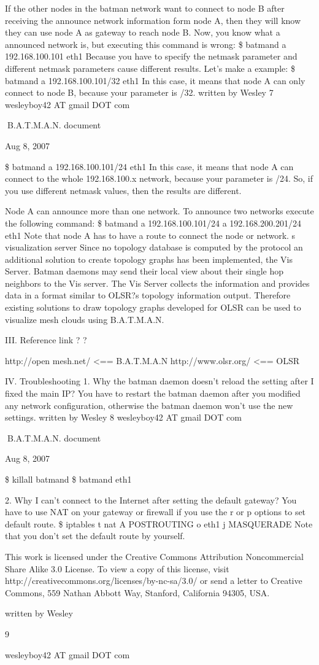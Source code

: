 \documentclass[
	12pt,
	a4paper,
	twoside,
	english,
	headsepline,
	footnosepline,
	automark,
	normalheadings,
	openany,
	cleardoubleplain,
	abstracton,
	idxtotoc,
	liststotoc,
	bibtotoc,
 	BCOR8mm,
]{scrartcl}
\begin{document}
If the other nodes in the batman network want to connect to node B after receiving the  announce network information form node A, then they will know they can use node A as  gateway to reach node B. Now, you know what a announced network is, but executing this command is wrong: \$ batmand   a 192.168.100.101  eth1  Because you have to specify the netmask parameter and different netmask parameters cause  different results. Let's make a example: \$ batmand   a 192.168.100.101/32  eth1 In this case, it means that node A can only connect to node B, because your parameter is /32. written by Wesley 7 wesleyboy42 AT gmail DOT com

B.A.T.M.A.N. document

Aug 8, 2007

\$ batmand   a 192.168.100.101/24  eth1 In this case, it means that node A can connect to the whole 192.168.100.x network, because  your parameter is /24. So, if you use different netmask values, then the results are different.

Node A can  announce more than one network. To announce two networks execute the following  command: \$ batmand   a 192.168.100.101/24   a 192.168.200.201/24 eth1  Note that node A has to have a route to connect the node or network.  s visualization server Since no topology database is computed by the protocol an additional solution to create  topology graphs has been implemented, the Vis Server. Batman daemons may send their  local view about their single hop neighbors to the Vis server. The Vis Server collects the  information and provides data in a format similar to OLSR?s topology information output.  Therefore existing solutions to draw topology graphs developed for OLSR can be used to  visualize mesh clouds using B.A.T.M.A.N.

III.  Reference link
? ?

http://open mesh.net/ <== B.A.T.M.A.N http://www.olsr.org/ <== OLSR 

IV.  Troubleshooting
1.  Why the batman daemon doesn't reload the setting after I fixed the main IP?
You have to restart the batman daemon after you modified any network configuration,  otherwise the batman daemon won't use the new settings.  written by Wesley 8 wesleyboy42 AT gmail DOT com

B.A.T.M.A.N. document

Aug 8, 2007

\$ killall batmand   \$ batmand eth1

2.  Why I can't connect to the Internet after setting the default gateway? 
You have to use NAT on your gateway or firewall if you use the  r or  p options to set default  route. \$ iptables  t nat  A POSTROUTING  o eth1  j MASQUERADE Note that you don't set the default route by yourself.

This work is licensed under the Creative Commons Attribution Noncommercial Share Alike 3.0 License. To 
view a copy of this license, visit http://creativecommons.org/licenses/by-nc-sa/3.0/ or send a letter to Creative  Commons, 559 Nathan Abbott Way, Stanford, California 94305, USA.

written by Wesley

9

wesleyboy42 AT gmail DOT com
\end{document}
